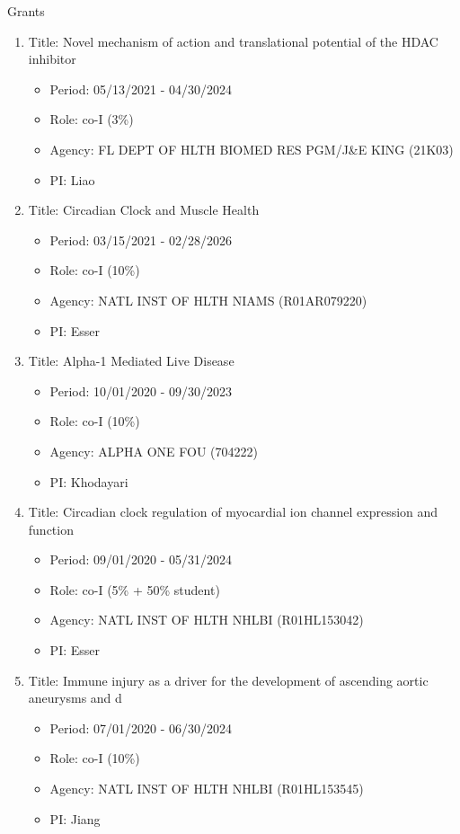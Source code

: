 \documentclass{resume} %
\begin{document}
\begin{rSection}{Grants}
\begin{enumerate}[noitemsep,topsep=0pt]
\item Title: Novel mechanism of action and translational potential of the HDAC inhibitor
\begin{itemize}[noitemsep,topsep=0pt,leftmargin=*]
\item[] Period: 05/13/2021 - 04/30/2024
\item[] Role: co-I (3\%)
\item[] Agency: FL DEPT OF HLTH BIOMED RES PGM/J\&E KING (21K03)
\item[] PI: Liao
\end{itemize}

\item Title: Circadian Clock and Muscle Health
\begin{itemize}[noitemsep,topsep=0pt,leftmargin=*]
\item[] Period: 03/15/2021 - 02/28/2026
\item[] Role: co-I (10\%)
\item[] Agency: NATL INST OF HLTH NIAMS (R01AR079220)
\item[] PI: Esser
\end{itemize}

\item Title: Alpha-1 Mediated Live Disease
\begin{itemize}[noitemsep,topsep=0pt,leftmargin=*]
\item[] Period: 10/01/2020 - 09/30/2023
\item[] Role: co-I (10\%)
\item[] Agency: ALPHA ONE FOU (704222)
\item[] PI: Khodayari
\end{itemize}

\item Title: Circadian clock regulation of myocardial ion channel expression and function
\begin{itemize}[noitemsep,topsep=0pt,leftmargin=*]
\item[] Period: 09/01/2020 - 05/31/2024
\item[] Role: co-I (5\% + 50\% student)
\item[] Agency: NATL INST OF HLTH NHLBI (R01HL153042)
\item[] PI: Esser
\end{itemize}

\item Title: Immune injury as a driver for the development of ascending aortic aneurysms and d
\begin{itemize}[noitemsep,topsep=0pt,leftmargin=*]
\item[] Period: 07/01/2020 - 06/30/2024
\item[] Role: co-I (10\%)
\item[] Agency: NATL INST OF HLTH NHLBI (R01HL153545)
\item[] PI: Jiang
\end{itemize}


\end{enumerate}
\end{rSection}
\end{document}
